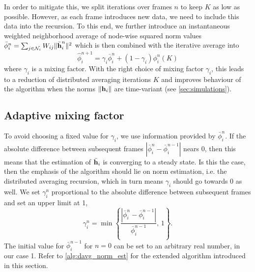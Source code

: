 \documentclass{article}
\begin{document}
In order to mitigate this, we split iterations over frames \(n\) to keep \(K\) as low as possible.
However, as each frame introduces new data, we need to include this data into the recursion.
To this end, we further introduce an instantaneous weighted neighborhood average of node-wise squared norm values \(\bar{\phi}_i^{n} = \sum_{j \in \mathcal{N}_i} W_{ij} \|\bar{\bm{\mathrm{h}}}_i^n\|^2\) which is then combined with the iterative average into
\begin{equation}
    \hat{\phi}_i^{n+1} = \gamma_i \bar{\phi}_i^{n} + (1-\gamma_i) \phi_i^{n}(K)
\end{equation}
where \(\gamma_i\) is a mixing factor.
With the right choice of mixing factor \(\gamma_i\), this leads to a reduction of distributed averaging iterations \(K\) and improves behaviour of the algorithm when the norms \(\|\bm{\mathrm{h}}_i\|\) are time-variant (see \autoref{sec:simulations}).

\subsection[]{Adaptive mixing factor}
To avoid choosing a fixed value for \(\gamma_i\), we use information provided by \(\bar{\phi}_i^{n}\).
If the absolute difference between subsequent frames \(| \bar{\phi}_i^{n} - \bar{\phi}_i^{n-1} |\) nears 0, then this means that the estimation of \(\bar{\bm{\mathrm{h}}}_i\) is converging to a steady state.
Is this the case, then the emphasis of the algorithm should lie on norm estimation, i.e. the distributed averaging recursion, which in turn means \(\gamma_i\) should go towards 0 as well.
We set \(\gamma_i^{n}\) proportional to the absolute difference between subsequent frames and set an upper limit at 1,
\begin{equation}
    \gamma_i^{n} = \min \left\lbrace \frac{| \bar{\phi}_i^{n} - \bar{\phi}_i^{n-1} |}{\bar{\phi}_i^{n-1}},\,1\right\rbrace.\label{eq:adaptivenormest:adaptivegamma}
\end{equation}
The initial value for \(\bar{\phi}_i^{n-1}\) for \(n=0\) can be set to an arbitrary real number, in our case 1.
Refer to \autoref{alg:davg_norm_est} for the extended algorithm introduced in this section.
\end{document}
